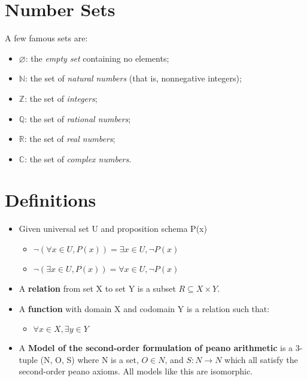 \section{Number Sets}
A few famous sets are:
\begin{itemize}
  \item $\varnothing$: the \textit{empty set} containing no elements;
  \item $\mathbb{N}$: the set of \textit{natural numbers} (that is, nonnegative integers);
  \item $\mathbb{Z}$: the set of \textit{integers};
  \item $\mathbb{Q}$: the set of \textit{rational numbers};
  \item $\mathbb{R}$: the set of \textit{real numbers};
  \item $\mathbb{C}$: the set of \textit{complex numbers}.
\end{itemize}
\section{Definitions}
\begin{itemize}
  \item Given universal set U and proposition schema P(x)
  \begin{itemize}
    \item $\neg(\forall x \in U, P(x)) = \exists x \in U, \neg P(x)$
    \item $\neg(\exists x \in U, P(x)) = \forall x \in U, \neg P(x)$
  \end{itemize}
  \item A \textbf{relation} from set X to set Y is a subset $R \subseteq X \times Y$.
  \item A \textbf{function} with domain X and codomain Y is a relation such that:
  \begin{itemize}
    \item $\forall x \in X, \exists y \in Y$
  \end{itemize}
  \item A \textbf{Model of the second-order formulation of peano arithmetic} is a 3-tuple (N, O, S) where N is a set, $O \in N$, and $S: N \to N$ which all satisfy the second-order peano axioms. All models like this are isomorphic.
\end{itemize}
